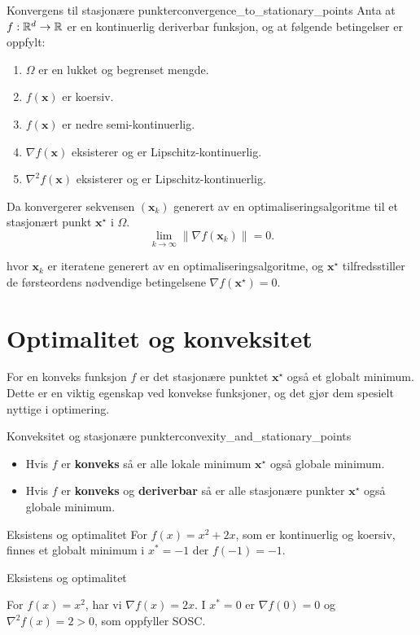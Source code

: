 \begin{theorem}{Konvergens til stasjonære punkter}{convergence_to_stationary_points}
	Anta at \(f: \mathbb{R}^d \to \mathbb{R}\) er en kontinuerlig deriverbar funksjon, og at følgende betingelser er oppfylt:
	\begin{enumerate}
		\item \(\Omega\) er en lukket og begrenset mengde.
		\item \(f(\symbf{x})\) er koersiv.
		\item \(f(\symbf{x})\) er nedre semi-kontinuerlig.
		\item \(\nabla f(\symbf{x})\) eksisterer og er Lipschitz-kontinuerlig.
		\item \(\nabla^2 f(\symbf{x})\) eksisterer og er Lipschitz-kontinuerlig.
	\end{enumerate}
	Da konvergerer sekvensen \((\symbf{x}_k)\) generert av en optimaliseringsalgoritme til et stasjonært punkt \(\symbf{x}^\star\) i \(\Omega\).
	\[
		\lim_{k \to \infty} \|\nabla f(\symbf{x}_k)\| = 0.
	\]

	hvor \(\symbf{x}_k\) er iteratene generert av en optimaliseringsalgoritme, og \(\symbf{x}^\star\) tilfredsstiller de førsteordens nødvendige betingelsene \(\nabla f(\symbf{x}^\star) = 0\).

\end{theorem}

\section{Optimalitet og konveksitet}
\label{sec:optimality_and_convexity}
For en konveks funksjon \(f\) er det stasjonære punktet \(\mathbf{x}^\star\) også et globalt minimum. Dette er en viktig egenskap ved konvekse funksjoner, og det gjør dem spesielt nyttige i optimering.

\begin{remark}{Konveksitet og stasjonære punkter}{convexity_and_stationary_points}
	\begin{itemize}
		\item Hvis \(f\) er \textbf{konveks} så er alle lokale minimum \(\mathbf{x}^\star\) også globale minimum.
		\item Hvis \(f\) er \textbf{konveks} og \textbf{deriverbar} så er alle stasjonære punkter \(\mathbf{x}^\star\) også globale minimum.
	\end{itemize}
\end{remark}

\begin{example}{Eksistens og optimalitet}{}
	For \( f(x) = x^2 + 2x \), som er kontinuerlig og koersiv, finnes et globalt minimum i \( x^* = -1 \) der \( f(-1) = -1 \).
\end{example}
\begin{example}{Eksistens og optimalitet}{}

	For \( f(x) = x^2 \), har vi \( \nabla f(x) = 2x \). I \( x^* = 0 \) er \( \nabla f(0) = 0 \) og \( \nabla^2 f(x) = 2 > 0 \), som oppfyller SOSC.

\end{example}
